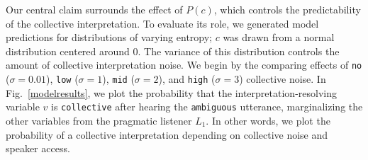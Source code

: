 \documentclass[preprint,12pt,authoryear,titlepage]{elsarticle}
\begin{document}
Our central claim surrounds the effect of $P(c)$, which controls the predictability of the collective interpretation. To evaluate its role, we generated model predictions for distributions of varying entropy; $c$ was drawn from a normal distribution centered around $0$. The variance of this distribution controls the amount of collective interpretation noise. We begin by the comparing effects of \texttt{no} ($\sigma=0.01$), \texttt{low} ($\sigma=1$), \texttt{mid} ($\sigma=2$), and \texttt{high} ($\sigma=3$) collective noise.
%
%
In Fig.~\ref{modelresults}, we plot the probability that the interpretation-resolving variable $v$ is \texttt{collective} after hearing the \texttt{ambiguous} utterance, marginalizing the other variables from the pragmatic listener $L_1$. In other words, we plot the probability of a collective interpretation depending on collective noise and speaker access.%

\end{document}
